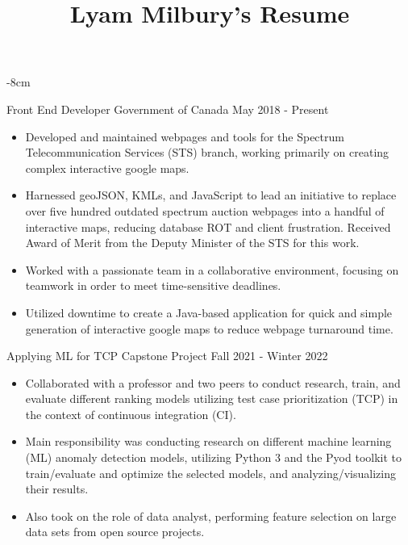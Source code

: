 \documentclass[10pt,a4paper]{altacv}
\begin{document}
\title{Lyam Milbury's Resume}

\begin{adjustwidth}{}{-8cm}
\makecvheader
\end{adjustwidth}


\cvproject
	{Front End Developer}
    {Government of Canada}
    {May 2018 - Present}
\begin{itemize}
	\item {Developed and maintained webpages and tools for the Spectrum Telecommunication Services (STS) branch, working primarily on creating complex interactive google maps.}
	\item {Harnessed geoJSON, KMLs, and JavaScript to lead an initiative to replace over five hundred outdated spectrum auction webpages into a handful of interactive maps, reducing database ROT and client frustration. Received Award of Merit from the Deputy Minister of the STS for this work.}
	\item {Worked with a passionate team in a collaborative environment, focusing on teamwork in order to meet time-sensitive deadlines.}
	\item {Utilized downtime to create a Java-based application for quick and simple generation of interactive google maps to reduce webpage turnaround time.}
\end{itemize}


\cvproject
	{Applying ML for TCP}
    {Capstone Project}
    {Fall 2021 - Winter 2022}
\begin{itemize}
	\item {Collaborated with a professor and two peers to conduct research, train, and evaluate different ranking models utilizing test case prioritization (TCP) in the context of continuous integration (CI).}
	\item {Main responsibility was conducting research on different machine learning (ML) anomaly detection models, utilizing Python 3 and the Pyod toolkit to train/evaluate and optimize the selected models, and analyzing/visualizing their results.}
	\item {Also took on the role of data analyst, performing feature selection on large data sets from open source projects.}
\end{itemize}
\end{document}
